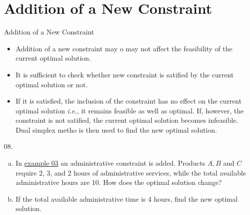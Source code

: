 
\section{Addition of a New Constraint}
\label{sec:addition-new-constraint}

\begin{frame}{Addition of a New Constraint}
  \begin{itemize} \justifying \parskip4mm
  \item Addition of a new constraint may o may not affect the feasibility of the current optimal solution.
  \item It is sufficient to check whether new constraint is satified by the current optimal solution or not.
  \item If it is satisfied, the inclusion of the constraint has no effect on the current optimal solution \emph{i.e.,} it remains feasible as well as optimal. If, however, the constraint is not satified, the current \alert{optimal solution becomes infeasible. Dual simplex metho is then used to find the new optimal solution.}
  \end{itemize}
\end{frame}

\begin{frameExample}{08.}{}
  
  \begin{enumerate}[a)] \justifying \parskip4mm
  \item In \hyperlink{example03}{example 03} an administrative constraint is added. Products $A, B$ and $C$ require 2, 3, and 2 hours of administrative services, while the total available administrative hours are 10. How does the optimal solution change?
  \item \label{example08} If the total available administrative time is 4 hours, find the new optimal solution.
  \end{enumerate}
\end{frameExample}

